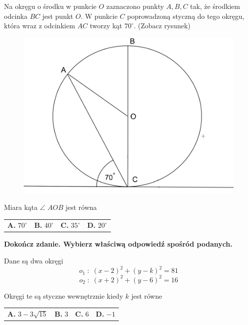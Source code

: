 \documentclass[12pt,a4paper]{article}
\theoremstyle{break}
\begin{document}
	Na okręgu o środku w punkcie $O$ zaznaczono punkty $A,B,C$ tak, że środkiem odcinka $BC$ jest punkt $O$. W punkcie $C$ poprowadzoną styczną do tego okręgu, która wraz z odcinkiem $AC$ tworzy kąt $70^\circ$. (Zobacz rysunek) 
	
	\begin{figure}[h]
		\centering
		\includegraphics[scale=0.5]{pm4.jpeg}
	\end{figure}
	
	Miara kąta $\angle$ $AOB$ jest równa
	
	\vspace{0.5cm}
	\begin{tabular}{p{3.5cm} p{3.5cm} p{3.5cm} p{3.5cm}}
		\textbf{A. }$70^\circ$&
		\textbf{B. }$40^\circ$&
		\textbf{C. }$35^\circ$&
		\textbf{D. }$20^\circ$\\
	\end{tabular}


	\begin{zad}[0-1]
		\textbf{Dokończ zdanie. Wybierz właściwą odpowiedź spośród podanych.}
	\end{zad} 
	
	Dane są dwa okręgi
	$$o_1\;:\;(x-2)^2+(y-k)^2=81$$
	$$o_2\;:\;(x+2)^2+(y-6)^2=16$$
	
	Okręgi te są styczne wewnętrznie kiedy $k$ jest równe
	
	\vspace{0.5cm}
	\begin{tabular}{p{3.5cm} p{3.5cm} p{3.5cm} p{3.5cm}}
		\textbf{A. }$3-3\sqrt{15}$&
		\textbf{B. }$3$&
		\textbf{C. }$6$&
		\textbf{D. }$-1$\\
	\end{tabular}
\end{document}
